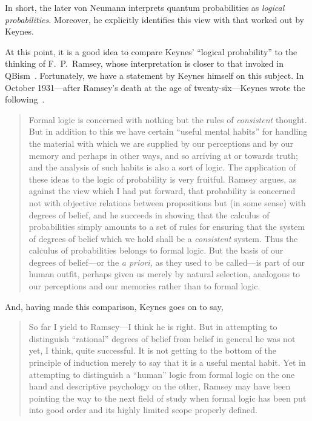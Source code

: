\documentclass[aps,pra,superscriptaddress,12pt,tightenlines,nofootinbib]{revtex4}
\begin{document}
In short, the later von Neumann interprets quantum probabilities as
\emph{logical probabilities.}  Moreover, he explicitly identifies this
view with that worked out by Keynes.

At this point, it is a good idea to compare Keynes' ``logical
probability'' to the thinking of F.\ P.\ Ramsey, whose interpretation
is closer to that invoked in QBism~\cite[pp.\ ix, 1225--29,
  1374]{Fuchs2014}.  Fortunately, we have a statement by Keynes
himself on this subject.  In October 1931---after Ramsey's death at
the age of twenty-six---Keynes wrote the following~\cite{Keynes1931}.
\begin{quotation}
Formal logic is concerned with nothing but the rules of
\emph{consistent} thought.  But in addition to this we have certain
``useful mental habits'' for handling the material with which we are
supplied by our perceptions and by our memory and perhaps in other
ways, and so arriving at or towards truth; and the analysis of such
habits is also a sort of logic.  The application of these ideas to the
logic of probability is very fruitful.  Ramsey argues, as against the
view which I had put forward, that probability is concerned not with
objective relations between propositions but (in some sense) with
degrees of belief, and he succeeds in showing that the calculus of
probabilities simply amounts to a set of rules for ensuring that the
system of degrees of belief which we hold shall be a \emph{consistent}
system.  Thus the calculus of probabilities belongs to formal logic.
But the basis of our degrees of belief---or the \emph{a priori,} as
they used to be called---is part of our human outfit, perhaps given us
merely by natural selection, analogous to our perceptions and our
memories rather than to formal logic.
\end{quotation}
And, having made this comparison, Keynes goes on to say,
\begin{quotation}
\noindent So far I yield to Ramsey---I think he is right.  But in
attempting to distinguish ``rational'' degrees of belief from belief
in general he was not yet, I think, quite successful.  It is not
getting to the bottom of the principle of induction merely to say that
it is a useful mental habit.  Yet in attempting to distinguish a
``human'' logic from formal logic on the one hand and descriptive
psychology on the other, Ramsey may have been pointing the way to the
next field of study when formal logic has been put into good order and
its highly limited scope properly defined.
\end{quotation}
\end{document}
